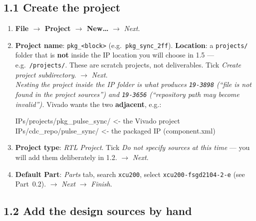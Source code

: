 \documentclass[10pt,a4paper]{article}
\newcommand{\code}[1]{\texttt{\small #1}}
\begin{document}
\subsection{1.1 Create the project}

\begin{enumerate}[leftmargin=1.4em, itemsep=1pt]
\item \textbf{File $\to$ Project $\to$ New\ldots} $\to$ \emph{Next}.
\item \textbf{Project name}: \code{pkg\_<block>} (e.g.\ \code{pkg\_sync\_2ff}).
  \textbf{Location}: a \code{projects/} folder that is \textbf{not} inside the IP
  location you will choose in 1.5 --- e.g.\ \code{<ip-root>/projects/}. These are
  scratch projects, not deliverables. Tick \emph{Create project subdirectory}.
  $\to$ \emph{Next}.
  \\[2pt]
  \emph{Nesting the project inside the IP folder is what produces
  \code{19-3898} (``file is not found in the project sources'') and \code{19-3656}
  (``repository path may become invalid'').} Vivado wants the two
  \textbf{adjacent}, e.g.:

\begin{cmd}
IPs/projects/pkg_pulse_sync/   <- the Vivado project
IPs/cdc_repo/pulse_sync/       <- the packaged IP (component.xml)
\end{cmd}
\item \textbf{Project type}: \emph{RTL Project}. Tick \emph{Do not specify sources
  at this time} --- you will add them deliberately in 1.2. $\to$ \emph{Next}.
\item \textbf{Default Part}: \emph{Parts} tab, search \code{xcu200}, select
  \code{xcu200-fsgd2104-2-e} (see Part~0.2). $\to$ \emph{Next} $\to$ \emph{Finish}.
\end{enumerate}

\subsection{1.2 Add the design sources by hand}
\end{document}
